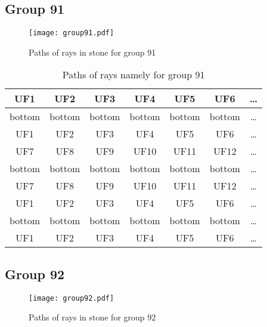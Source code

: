 \subsection*{Group 91}






\begin{figure}[h!]
\centering
\texttt{[image: group91.pdf]}
\caption{Paths of rays in stone for group 91}
\label{table:FigGroup91}
\end{figure}



\begin{table}[h!]
\centering
\begin{tabular}{|c|c|c|c|c|c|c|}
\hline
UF1 & UF2 & UF3 & UF4 & UF5 & UF6 & \dots \\
\hline
bottom & bottom & bottom & bottom & bottom & bottom & \dots \\
\hline
UF1 & UF2 & UF3 & UF4 & UF5 & UF6 & \dots \\
\hline
UF7 & UF8 & UF9 & UF10 & UF11 & UF12 & \dots \\
\hline
bottom & bottom & bottom & bottom & bottom & bottom & \dots \\
\hline
UF7 & UF8 & UF9 & UF10 & UF11 & UF12 & \dots \\
\hline
UF1 & UF2 & UF3 & UF4 & UF5 & UF6 & \dots \\
\hline
bottom & bottom & bottom & bottom & bottom & bottom & \dots \\
\hline
UF1 & UF2 & UF3 & UF4 & UF5 & UF6 & \dots \\
\hline
\end{tabular}
\caption{Paths of rays namely for group 91}
\label{table:TableGroup91}
\end{table}
\newpage
\subsection*{Group 92}






\begin{figure}[h!]
\centering
\texttt{[image: group92.pdf]}
\caption{Paths of rays in stone for group 92}
\label{table:FigGroup92}
\end{figure}



